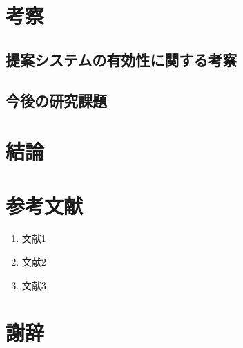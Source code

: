 \documentclass[uplatex,a4j,10pt,titlepage]{jsarticle}
\begin{document}
\clearpage
\section{考察}
\subsection{提案システムの有効性に関する考察}
\subsection{今後の研究課題}

\section{結論}

\section*{参考文献}
\begin{enumerate}
	\item 文献1
	\item 文献2
	\item 文献3
\end{enumerate}

\section*{謝辞}
\end{document}
